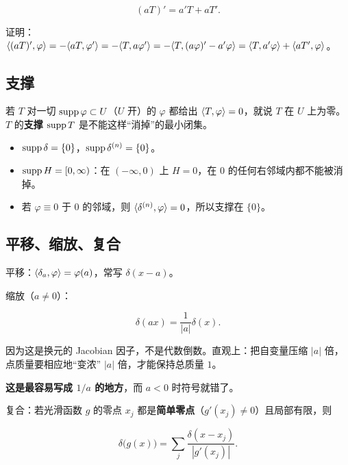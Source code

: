 \begin{equation}
(aT)'=a'T+aT' .
\end{equation}

证明：$\langle (aT)',\varphi\rangle=-\langle aT,\varphi'\rangle=-\langle T,a\varphi'\rangle=-\langle T,(a\varphi)'-a'\varphi\rangle=\langle T,a'\varphi\rangle+\langle aT',\varphi\rangle$。

\subsection{支撑}

\begin{defn}[在开集上为零]
若 $T$ 对一切 $\operatorname{supp}\varphi\subset U$（$U$ 开）的 $\varphi$ 都给出 $\langle T,\varphi\rangle=0$，就说 $T$ 在 $U$ 上为零。$T$ 的\textbf{支撑} $\operatorname{supp} T$ 是不能这样“消掉”的最小闭集。
\end{defn}

\begin{itemize}[leftmargin=1.6em,itemsep=0.3em]
\item $\operatorname{supp}\delta=\{0\}$，$\operatorname{supp}\delta^{(n)}=\{0\}$。
\item $\operatorname{supp} H=[0,\infty)$：在 $(-\infty,0)$ 上 $H=0$，在 $0$ 的任何右邻域内都不能被消掉。
\item 若 $\varphi\equiv0$ 于 $0$ 的邻域，则 $\langle \delta^{(n)},\varphi\rangle=0$，所以支撑在 $\{0\}$。
\end{itemize}

\subsection{平移、缩放、复合}

平移：$\langle \delta_a,\varphi\rangle=\varphi(a)$，常写 $\delta(x-a)$。

缩放（$a\neq0$）：

\begin{equation}
\delta(ax)=\frac{1}{|a|}\delta(x).\label{eq:scaling-delta}
\end{equation}

\begin{ideabox}
因为这是换元的 Jacobian 因子，不是代数倒数。直观上：把自变量压缩 $|a|$ 倍，点质量要相应地“变浓” $|a|$ 倍，才能保持总质量 $1$。

\textbf{这是最容易写成 $1/a$ 的地方}，而 $a<0$ 时符号就错了。
\end{ideabox}

复合：若光滑函数 $g$ 的零点 $x_j$ 都是\textbf{简单零点}（$g'(x_j)\neq0$）且局部有限，则

\begin{equation}
\delta\big(g(x)\big)=\sum_{j}\frac{\delta(x-x_{j})}{|g'(x_{j})|} .\label{eq:delta-compose}
\end{equation}


